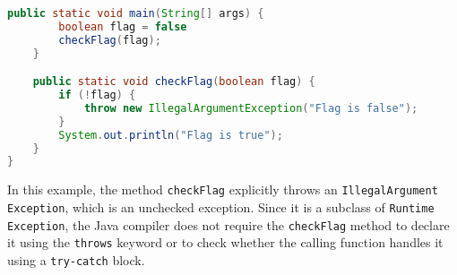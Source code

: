 \begin{itemize}
\begin{lstlisting}[language=java]
    public static void main(String[] args) {
        boolean flag = false
        checkFlag(flag);
    }

    public static void checkFlag(boolean flag) {
        if (!flag) {
            throw new IllegalArgumentException("Flag is false");
        }
        System.out.println("Flag is true");
    }
}
    \end{lstlisting}
    In this example, the method \texttt{checkFlag} explicitly throws an \texttt{IllegalArgument\\Exception},
    which is an unchecked exception. Since it is a subclass of \texttt{Runtime\\Exception}, the Java compiler
    does not require the \texttt{checkFlag} method to declare it using the \texttt{throws} keyword or
    to check whether the calling function handles it using a \texttt{try-catch} block.
\end{itemize}

